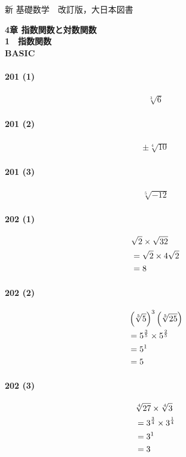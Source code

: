 \documentclass[fleqn,a4j,dvipdfmx,uplatex,twocolumn]{jsarticle}
\def\nr{\notag\\}%
\begin{document}
\begin{flushleft}
  新 基礎数学　改訂版，大日本図書
\end{flushleft}
\begin{center}
  \textbf{4章 指数関数と対数関数}\\
  \textbf{1　指数関数}\\
  \textbf{BASIC}\\
\end{center}

\paragraph{201 (1)}
\begin{align*}
  \sqrt[3]{6}
\end{align*}

\paragraph{201 (2)}
\begin{align*}
  \pm\sqrt[4]{10}
\end{align*}

\paragraph{201 (3)}
\begin{align*}
  \sqrt[5]{-12}
\end{align*}

\paragraph{202 (1)}
\begin{align*}
  &\sqrt{2} \times \sqrt{32} \nr
  &= \sqrt{2} \times 4\sqrt{2} \nr
  &= 8
\end{align*}

\paragraph{202 (2)}
\begin{align*}
  &\left(\sqrt[5]{5}\right)^3\left(\sqrt[5]{25}\right) \nr
  &= 5^{\frac{3}{5}} \times 5^{\frac{2}{5}} \nr
  &= 5^1 \nr
  &= 5
\end{align*}

\paragraph{202 (3)}
\begin{align*}
  &\sqrt[4]{27} \times \sqrt[4]{3} \nr
  &= 3^{\frac{3}{4}} \times 3^{\frac{1}{4}} \nr
  &= 3^1 \nr
  &= 3
\end{align*}
\end{document}
